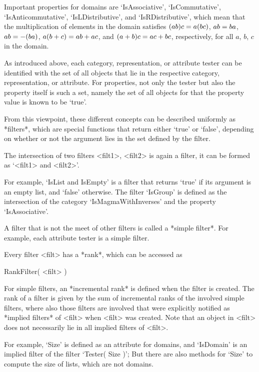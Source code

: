 Important properties for domains are `IsAssociative', `IsCommutative',
`IsAnticommutative', `IsLDistributive', and `IsRDistributive',
which mean that the multiplication of elements in the domain satisfies
$(a \* b ) \* c = a \* ( b \* c )$, $a \* b = b \* a$,
$a \* b = - ( b \* a )$, $a \* ( b + c ) = a \* b + a \* c$,
and $( a + b ) \* c = a \* c + b \* c$, respectively,
for all $a$, $b$, $c$ in the domain.


As introduced above, each category, representation, or attribute tester
can be identified with the set of all objects that lie in the respective
category, representation, or attribute.
For properties, not only the tester but also the property itself is such
a set,
namely the set of all objects for that the property value is known to be
`true'.

{}From this viewpoint, these different concepts can be described
uniformly as *filters*,
which are special {\GAP} functions that return either `true' or `false',
depending on whether or not the argument lies in the set defined by the
filter.

The intersection of two filters <filt1>, <filt2> is again a filter,
it can be formed as `<filt1> and <filt2>'.

For example, `IsList and IsEmpty' is a filter that returns `true'
if its argument is an empty list, and `false' otherwise.
The filter `IsGroup' is defined as the intersection of the category
`IsMagmaWithInverses' and the property `IsAssociative'.

A filter that is not the meet of other filters
is called a *simple filter*.
For example, each attribute tester is a simple filter.

Every filter <filt> has a *rank*, which can be accessed as

\>RankFilter( <filt> )

For simple filters, an *incremental rank* is defined when the filter is
created.
The rank of a filter is given by the sum of incremental ranks of the
involved simple filters,
where also those filters are involved that were explicitly notified as
*implied filters* of <filt> when <filt> was created.
Note that an object in <filt> does not necessarily lie in all
implied filters of <filt>.

For example, `Size' is defined as an attribute for domains,
and `IsDomain' is an implied filter of the filter `Tester( Size )';
But there are also methods for `Size' to compute the size of lists,
which are not domains.

